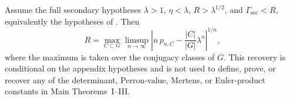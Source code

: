 \begin{corollary}
  \label{cor:class-secondary-term-detects-spectrum}
  Assume the full secondary hypotheses \(\lambda>1\),
  \(\eta<\lambda\), \(R>\lambda^{1/2}\), and
  \(\Gamma_{\mathrm{sec}}<R\), equivalently the hypotheses of
  .  Then
  \[
    R
    =
    \max_{C\subset G}
      \limsup_{n\to\infty}
      \left|
        n\,p_{n,C}-\frac{|C|}{|G|}\lambda^n
      \right|^{1/n},
  \]
  where the maximum is taken over the conjugacy classes of \(G\).  This
  recovery is conditional on the appendix hypotheses and is not used to
  define, prove, or recover any of the determinant, Perron-value, Mertens,
  or Euler-product constants in Main Theorems~I--III.

\end{corollary}

